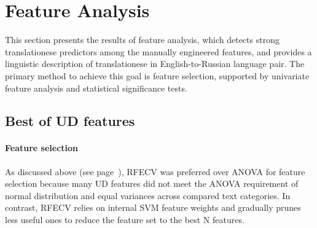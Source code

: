 \section{\label{sec:bestof}Feature Analysis}
This section presents the results of feature analysis, which detects strong translationese predictors among the manually engineered features, and provides a linguistic description of translationese in English-to-Russian language pair.
The primary method to achieve this goal is feature selection, supported by univariate feature analysis and statistical significance tests.


\subsection{\label{ssec:best_ud}Best of UD features}

\paragraph{\label{par:detect_select}Feature selection}
As discussed above (see page~\pageref{par:featanal_meths}), \gls{RFECV} was preferred over \gls{ANOVA} for feature selection because many UD features did not meet the ANOVA requirement of normal distribution and equal variances across compared text categories. In contrast, RFECV relies on internal SVM feature weights and gradually prunes less useful ones to reduce the feature set to the best N features. 


